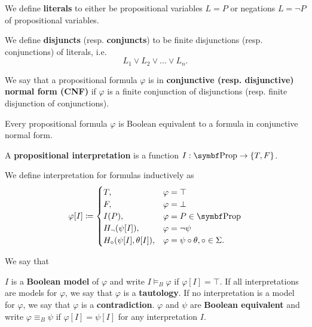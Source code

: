 \begin{definition}\label{def:conjunctive_normal_form}
  We define \textbf{literals} to either be propositional variables \( L = P \) or negations \( L = \neg P \) of propositional variables.

  We define \textbf{disjuncts} (resp. \textbf{conjuncts}) to be finite disjunctions (resp. conjunctions) of literals, i.e.
  \begin{equation*}
    L_1 \lor L_2 \lor \ldots \lor L_n.
  \end{equation*}

  We say that a propositional formula \( \varphi \) is in \textbf{conjunctive (resp. disjunctive) normal form (CNF)} if \( \varphi \) is a finite conjunction of disjunctions (resp. finite disjunction of conjunctions).
\end{definition}

\begin{proposition}\label{thm:conjunctive_normal_form_reduction}
  Every propositional formula \( \varphi \) is Boolean equivalent to a formula in conjunctive normal form.
\end{proposition}

\begin{definition}\label{def:propositional_interpretation}
  A \textbf{propositional interpretation} is a function \( I: \Bold{Prop} \to \{ T, F \} \).

  We define interpretation for formulas inductively as
  \begin{align*}
    \varphi[I] \coloneqq \begin{cases}
      T,                           &\varphi = \top \\
      F,                           &\varphi = \bot \\
      I(P),                        &\varphi = P \in \Bold{Prop} \\
      H_\neg(\psi[I]),             &\varphi = \neg \psi         \\
      H_\circ(\psi[I], \theta[I]), &\varphi = \psi \circ \theta, \circ \in \Sigma.
    \end{cases}
  \end{align*}

  We say that
  \begin{defenum}
     \( I \) is a \textbf{Boolean model} of \( \varphi \) and write \( I \models_B \varphi \) if \( \varphi[I] = \top \).
     If all interpretations are models for \( \varphi \), we say that \( \varphi \) is a \textbf{tautology}.
     If no interpretation is a model for \( \varphi \), we say that \( \varphi \) is a \textbf{contradiction}.
     \( \varphi \) and \( \psi \) are \textbf{Boolean equivalent} and write \( \varphi \equiv_B \psi \) if \( \varphi[I] = \psi[I] \) for any interpretation \( I \).
  \end{defenum}
\end{definition}

